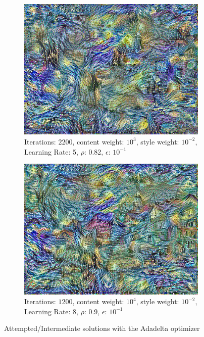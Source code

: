 \documentclass[12pt]{article}
\begin{document}
\begin{figure}[h!]
  \centering
  \begin{subfigure}[b]{0.35\linewidth}
    \includegraphics[width=\linewidth]{solution.jpg}
    \caption{Iterations: $2200$, content weight: $10^3$, style weight: $10^{-2}$, Learning Rate: 5, $\rho$: 0.82, $\epsilon$: $10^{-1}$}
  \end{subfigure}
  \begin{subfigure}[b]{0.35\linewidth}
    \includegraphics[width=\linewidth]{solution2.jpg}
    \caption{Iterations: $1200$, content weight: $10^4$, style weight: $10^{-2}$, Learning Rate: 8, $\rho$: 0.9, $\epsilon$: $10^{-1}$}
  \end{subfigure}
  \caption{Attempted/Intermediate solutions with the Adadelta optimizer}
  \label{fig:IntermediateSolutions}
\end{figure}
\end{document}
